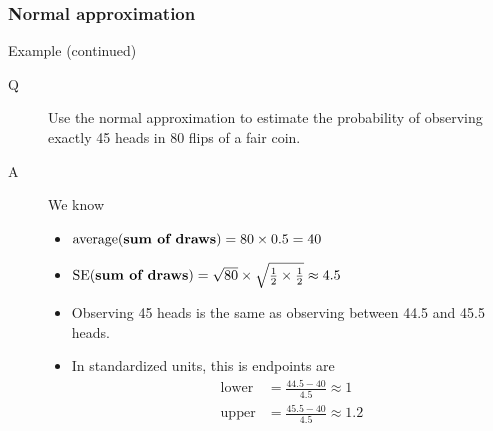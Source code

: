 \documentclass[handout]{beamer}
\begin{document}

   \begin{frame} \frametitle{Normal approximation}

   \begin{block}
   {Example (continued)}
   \begin{description}
   \item[Q] Use the normal approximation to estimate the
     probability of observing exactly 45 heads in 80 flips of a fair coin.
   \item[A] We know
     \begin{itemize}
     \item $\text{average({\bf sum of draws})} = 80 \times 0.5 = 40 $
     \item $\text{SE({\bf sum of draws})} = \sqrt{80} \times \sqrt{\frac{1}{2} \times  \frac{1}{2}} \approx 4.5 $
     \item Observing 45 heads is the same as observing between 44.5 and 45.5 heads.
       \item In standardized units, this is endpoints are
       $$
       \begin{aligned}
       \text{lower}&= \frac{44.5-40}{4.5}    \approx 1 \\
       \text{upper}&= \frac{45.5-40}{4.5}    \approx 1.2 \\
       \end{aligned}
       $$
     \end{itemize}
   \end{description}
   \end{block}
   \end{frame}

\end{document}
